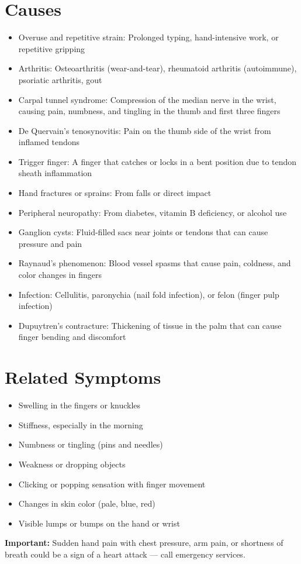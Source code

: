 \section*{Causes}
\begin{itemize}
  \item Overuse and repetitive strain: Prolonged typing, hand-intensive work, or repetitive gripping
  \item Arthritis: Osteoarthritis (wear-and-tear), rheumatoid arthritis (autoimmune), psoriatic arthritis, gout
  \item Carpal tunnel syndrome: Compression of the median nerve in the wrist, causing pain, numbness, and tingling in the thumb and first three fingers
  \item De Quervain's tenosynovitis: Pain on the thumb side of the wrist from inflamed tendons
  \item Trigger finger: A finger that catches or locks in a bent position due to tendon sheath inflammation
  \item Hand fractures or sprains: From falls or direct impact
  \item Peripheral neuropathy: From diabetes, vitamin B deficiency, or alcohol use
  \item Ganglion cysts: Fluid-filled sacs near joints or tendons that can cause pressure and pain
  \item Raynaud's phenomenon: Blood vessel spasms that cause pain, coldness, and color changes in fingers
  \item Infection: Cellulitis, paronychia (nail fold infection), or felon (finger pulp infection)
  \item Dupuytren's contracture: Thickening of tissue in the palm that can cause finger bending and discomfort
\end{itemize}

\section*{Related Symptoms}
\begin{itemize}
  \item Swelling in the fingers or knuckles
  \item Stiffness, especially in the morning
  \item Numbness or tingling (pins and needles)
  \item Weakness or dropping objects
  \item Clicking or popping sensation with finger movement
  \item Changes in skin color (pale, blue, red)
  \item Visible lumps or bumps on the hand or wrist
\end{itemize}
\textbf{Important:} Sudden hand pain with chest pressure, arm pain, or shortness of breath could be a sign of a heart attack — call emergency services.

